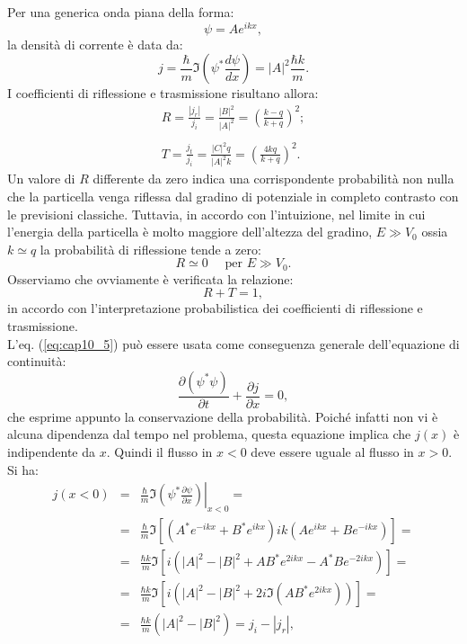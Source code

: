 Per una generica onda piana della forma:
\begin{equation}
\psi= Ae^{ikx},
\end{equation}
la densità di corrente è data da:
\begin{equation}
j=\frac{\hbar}{m}\Im \left(\psi ^* \frac{d\psi}{dx} \right)= |A|^2\frac{\hbar k}{m}.
\end{equation}
I coefficienti di riflessione e trasmissione risultano allora:
\begin{eqnarray}
R=\frac{|j_r|}{j_i}= \frac{|B|^2}{|A|^2}=\left(\frac{k-q}{k+q}\right)^2;\nonumber \\
\\
T=\frac{j_t}{j_i}= \frac{|C|^2 q}{|A|^2 k}=\left(\frac{4kq}{k+q}\right)^2.\nonumber 
\end{eqnarray}
Un valore di $R$ differente da zero indica una corrispondente probabilità non nulla che la particella venga riflessa dal gradino di potenziale in completo contrasto con le previsioni classiche. Tuttavia, in accordo con l'intuizione, nel limite in cui l'energia della particella è molto maggiore dell'altezza del gradino, $E\gg V_0$ ossia $k\simeq q$ la probabilità di riflessione tende a zero:
\begin{equation}
R\simeq 0\quad  \textrm{ per } E\gg V_0.
\end{equation}
Osserviamo che ovviamente è verificata la relazione:
\begin{equation}
R+T=1,
\label{eq:cap10_5}
\end{equation}
in accordo con l'interpretazione probabilistica dei coefficienti di riflessione e trasmissione.\\
L'eq. (\ref{eq:cap10_5}) può essere usata come conseguenza generale dell'equazione di continuità:
\begin{equation}
\frac{\partial \left(\psi^* \psi \right)}{\partial t}+ \frac{\partial j}{\partial x}=0,
\end{equation}
che esprime appunto la conservazione della probabilità. Poiché infatti non vi è alcuna dipendenza dal tempo nel problema, questa equazione implica che $j(x)$ è indipendente da $x$. Quindi il flusso in $x<0$ deve essere uguale al flusso in $x>0$. Si ha:
\begin{eqnarray}
j\left( x<0 \right) &=& \frac{\hbar}{m} \Im \left. \left( \psi ^* \frac{\partial \psi}{\partial x} \right) \right| _{x<0} = \nonumber \\
&=& \frac{\hbar}{m} \Im \left[ \left( A^* e^{-ikx} + B^* e^{ikx}\right)ik \left( A e^{ikx} + B e^{-ikx}\right)\right]= \nonumber \\
&=&\frac{\hbar k}{m} \Im \left[ i\left( |A|^2 - |B|^2 +AB^* e^{2ikx}- A^* B e^{-2ikx}\right)\right]= \nonumber \\
&=&\frac{\hbar k}{m} \Im \left[ i\left( |A|^2 - |B|^2 +2i \Im \left( A B^* e^{2ikx}\right) \right)\right]= \nonumber \\
&=& \frac{\hbar k}{m}\left( |A|^2 - |B|^2\right)= j_i- |j_r|,
\end{eqnarray}
